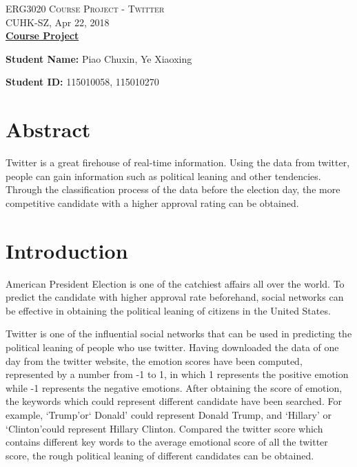 \documentclass[12pt,a4paper]{article}
\begin{document}
\begin{center}
\textsc{ERG3020 Course Project - Twitter} \\
CUHK-SZ, Apr 22, 2018
\\[\baselineskip]
		
\textbf{\underline{Course Project}}
\end{center}
	
\noindent\textbf{Student Name:}  Piao Chuxin, Ye Xiaoxing

\noindent\textbf{Student ID:}  115010058, 115010270
	
\noindent\hrulefill

\tableofcontents

\newpage

\section{Abstract}

  Twitter is a great firehouse of real-time information. Using the data from twitter, people can gain information such as political leaning and other tendencies. Through the classification process of the data before the election day, the more competitive candidate with a higher approval rating can be obtained.

\section{Introduction}

  American President Election is one of the catchiest affairs all over the world. To predict the candidate with higher approval rate beforehand, social networks can be effective in obtaining the political leaning of citizens in the United States. 

  Twitter is one of the influential social networks that can be used in predicting the political leaning of people who use twitter. Having downloaded the data of one day from the twitter website, the emotion scores have been computed, represented by a number from -1 to 1, in which 1 represents the positive emotion while -1 represents the negative emotions. After obtaining the score of emotion, the keywords which could represent different candidate have been searched. For example, ‘Trump’or‘ Donald’ could represent Donald Trump, and ‘Hillary’ or ‘Clinton’could represent Hillary Clinton. Compared the twitter score which contains different key words to the average emotional score of all the twitter score, the rough political leaning of different candidates can be obtained.
  
\end{document}
